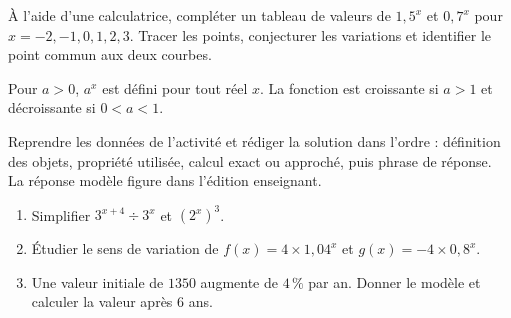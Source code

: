 \begin{activite}
À l'aide d'une calculatrice, compléter un tableau de valeurs de $1{,}5^x$ et $0{,}7^x$ pour $x=-2,-1,0,1,2,3$. Tracer les points, conjecturer les variations et identifier le point commun aux deux courbes.
\begin{center}\end{center}
\end{activite}

\begin{traceecrite}Pour $a>0$, $a^x$ est défini pour tout réel $x$. La fonction est croissante si $a>1$ et décroissante si $0<a<1$.\end{traceecrite}

\begin{exemple}
Reprendre les données de l'activité et rédiger la solution dans l'ordre : définition des objets, propriété utilisée, calcul exact ou approché, puis phrase de réponse. La réponse modèle figure dans l'édition enseignant.
\end{exemple}

\begin{exercice}[-- essentiel]
\begin{enumerate}\item Simplifier $3^{x+4}\div3^x$ et $(2^x)^3$.\item Étudier le sens de variation de $f(x)=4\times1{,}04^x$ et $g(x)=-4\times0{,}8^x$.\item Une valeur initiale de $1350$ augmente de $4\,\%$ par an. Donner le modèle et calculer la valeur après $6$ ans.\end{enumerate}
\end{exercice}

